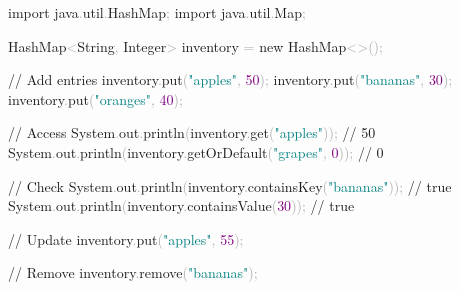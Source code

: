 \documentclass[
  justified,
  openright,
]{tufte-book}
\newcommand{\BuiltInTok}[1]{#1}
\newcommand{\CommentTok}[1]{\textcolor{MidGray}{#1}}
\newcommand{\DecValTok}[1]{\textcolor{Purple}{#1}}
\newcommand{\FunctionTok}[1]{\textcolor{BrandBlue}{#1}}
\newcommand{\ImportTok}[1]{\textcolor{BrandAccent}{#1}}
\newcommand{\KeywordTok}[1]{\textcolor{BrandBlue}{#1}}
\newcommand{\NormalTok}[1]{#1}
\newcommand{\OperatorTok}[1]{\textcolor{DarkGray}{#1}}
\newcommand{\StringTok}[1]{\textcolor{Teal}{#1}}
\newenvironment{Shaded}{%
  \begin{snugshade}
}{%
  \end{snugshade}
}
\begin{document}
\begin{Shaded}
\begin{Highlighting}[]
\KeywordTok{import} \ImportTok{java}\OperatorTok{.}\ImportTok{util}\OperatorTok{.}\ImportTok{HashMap}\OperatorTok{;}
\KeywordTok{import} \ImportTok{java}\OperatorTok{.}\ImportTok{util}\OperatorTok{.}\ImportTok{Map}\OperatorTok{;}

\BuiltInTok{HashMap}\OperatorTok{\textless{}}\BuiltInTok{String}\OperatorTok{,} \BuiltInTok{Integer}\OperatorTok{\textgreater{}}\NormalTok{ inventory }\OperatorTok{=} \KeywordTok{new} \BuiltInTok{HashMap}\OperatorTok{\textless{}\textgreater{}();}

\CommentTok{// Add entries}
\NormalTok{inventory}\OperatorTok{.}\FunctionTok{put}\OperatorTok{(}\StringTok{"apples"}\OperatorTok{,} \DecValTok{50}\OperatorTok{);}
\NormalTok{inventory}\OperatorTok{.}\FunctionTok{put}\OperatorTok{(}\StringTok{"bananas"}\OperatorTok{,} \DecValTok{30}\OperatorTok{);}
\NormalTok{inventory}\OperatorTok{.}\FunctionTok{put}\OperatorTok{(}\StringTok{"oranges"}\OperatorTok{,} \DecValTok{40}\OperatorTok{);}

\CommentTok{// Access}
\BuiltInTok{System}\OperatorTok{.}\FunctionTok{out}\OperatorTok{.}\FunctionTok{println}\OperatorTok{(}\NormalTok{inventory}\OperatorTok{.}\FunctionTok{get}\OperatorTok{(}\StringTok{"apples"}\OperatorTok{));}           \CommentTok{// 50}
\BuiltInTok{System}\OperatorTok{.}\FunctionTok{out}\OperatorTok{.}\FunctionTok{println}\OperatorTok{(}\NormalTok{inventory}\OperatorTok{.}\FunctionTok{getOrDefault}\OperatorTok{(}\StringTok{"grapes"}\OperatorTok{,} \DecValTok{0}\OperatorTok{));} \CommentTok{// 0}

\CommentTok{// Check}
\BuiltInTok{System}\OperatorTok{.}\FunctionTok{out}\OperatorTok{.}\FunctionTok{println}\OperatorTok{(}\NormalTok{inventory}\OperatorTok{.}\FunctionTok{containsKey}\OperatorTok{(}\StringTok{"bananas"}\OperatorTok{));}   \CommentTok{// true}
\BuiltInTok{System}\OperatorTok{.}\FunctionTok{out}\OperatorTok{.}\FunctionTok{println}\OperatorTok{(}\NormalTok{inventory}\OperatorTok{.}\FunctionTok{containsValue}\OperatorTok{(}\DecValTok{30}\OperatorTok{));}         \CommentTok{// true}

\CommentTok{// Update}
\NormalTok{inventory}\OperatorTok{.}\FunctionTok{put}\OperatorTok{(}\StringTok{"apples"}\OperatorTok{,} \DecValTok{55}\OperatorTok{);}

\CommentTok{// Remove}
\NormalTok{inventory}\OperatorTok{.}\FunctionTok{remove}\OperatorTok{(}\StringTok{"bananas"}\OperatorTok{);}


\end{Highlighting}
\end{Shaded}
\end{document}
